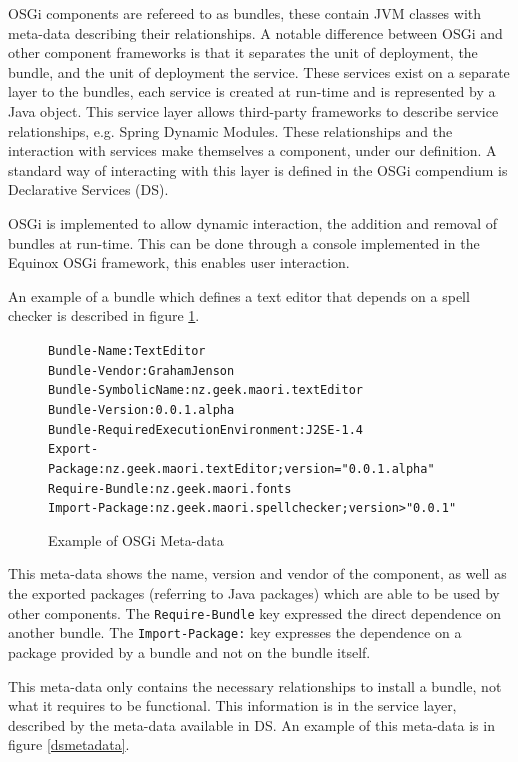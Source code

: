 OSGi components are refereed to as bundles, these contain JVM classes with meta-data describing their relationships.
A notable difference between OSGi and other component frameworks is that it separates the unit of deployment, the bundle, and the unit of deployment the service.
These services exist on a separate layer to the bundles, each service is created at run-time and is represented by a Java object.
This service layer allows third-party frameworks to describe service relationships, e.g. Spring Dynamic Modules.
These relationships and the interaction with services make themselves a component, under our definition.
A standard way of interacting with this layer is defined in the OSGi compendium is Declarative Services (DS).

OSGi is implemented to allow dynamic interaction, the addition and removal of bundles at run-time.
This can be done through a console implemented in the Equinox OSGi framework, this enables user interaction.

An example of a bundle which defines a text editor that depends on a spell checker is described in figure \ref{osgibundle}.

\begin{figure}[htp]
\begin{center}
\begin{alltt}
Bundle-Name: TextEditor
Bundle-Vendor: Graham Jenson
Bundle-SymbolicName: nz.geek.maori.textEditor
Bundle-Version: 0.0.1.alpha
Bundle-RequiredExecutionEnvironment: J2SE-1.4
Export-Package: nz.geek.maori.textEditor;version="0.0.1.alpha"
Require-Bundle: nz.geek.maori.fonts
Import-Package: nz.geek.maori.spellchecker;version>"0.0.1"
\end{alltt}
  \caption[OSGi Meta-data]{Example of OSGi Meta-data}
  \label{osgibundle}
\end{center}
\end{figure}

This meta-data shows the name, version and vendor of the component, as well as the exported packages (referring to Java packages) which are able to be used by other components.
The \verb+Require-Bundle+ key expressed the direct dependence on another bundle.
The \verb+Import-Package:+ key expresses the dependence on a package provided by a bundle and not on the bundle itself.

This meta-data only contains the necessary relationships to install a bundle, not what it requires to be functional.
This information is in the service layer, described by the meta-data available in DS.
An example of this meta-data is in figure \ref{dsmetadata}.

